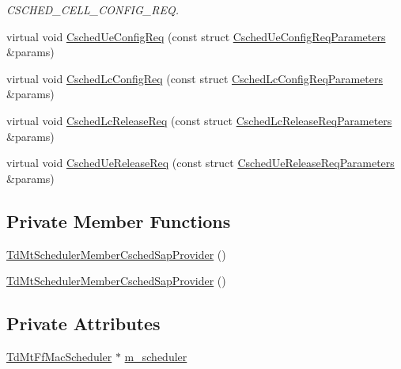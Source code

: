 \begin{DoxyCompactItemize}
\begin{DoxyCompactList}\small\item\em C\+S\+C\+H\+E\+D\+\_\+\+C\+E\+L\+L\+\_\+\+C\+O\+N\+F\+I\+G\+\_\+\+R\+EQ. \end{DoxyCompactList}\item 
virtual void \hyperlink{classns3_1_1TdMtSchedulerMemberCschedSapProvider_a41c5681871a2a5e0c9b5624b250d0a00}{Csched\+Ue\+Config\+Req} (const struct \hyperlink{structns3_1_1FfMacCschedSapProvider_1_1CschedUeConfigReqParameters}{Csched\+Ue\+Config\+Req\+Parameters} \&params)
\item 
virtual void \hyperlink{classns3_1_1TdMtSchedulerMemberCschedSapProvider_aef833b849d0f53fb16a9418734cc475c}{Csched\+Lc\+Config\+Req} (const struct \hyperlink{structns3_1_1FfMacCschedSapProvider_1_1CschedLcConfigReqParameters}{Csched\+Lc\+Config\+Req\+Parameters} \&params)
\item 
virtual void \hyperlink{classns3_1_1TdMtSchedulerMemberCschedSapProvider_aa1c0ff792851c9d7fdee4dc8f8e6caa5}{Csched\+Lc\+Release\+Req} (const struct \hyperlink{structns3_1_1FfMacCschedSapProvider_1_1CschedLcReleaseReqParameters}{Csched\+Lc\+Release\+Req\+Parameters} \&params)
\item 
virtual void \hyperlink{classns3_1_1TdMtSchedulerMemberCschedSapProvider_aec882a4915162718d2aa0ed132a26c27}{Csched\+Ue\+Release\+Req} (const struct \hyperlink{structns3_1_1FfMacCschedSapProvider_1_1CschedUeReleaseReqParameters}{Csched\+Ue\+Release\+Req\+Parameters} \&params)
\end{DoxyCompactItemize}
\subsection*{Private Member Functions}
\begin{DoxyCompactItemize}
\item 
\hyperlink{classns3_1_1TdMtSchedulerMemberCschedSapProvider_ae5c4d5951cd413ad543e828dc4648ed8}{Td\+Mt\+Scheduler\+Member\+Csched\+Sap\+Provider} ()
\item 
\hyperlink{classns3_1_1TdMtSchedulerMemberCschedSapProvider_ae5c4d5951cd413ad543e828dc4648ed8}{Td\+Mt\+Scheduler\+Member\+Csched\+Sap\+Provider} ()
\end{DoxyCompactItemize}
\subsection*{Private Attributes}
\begin{DoxyCompactItemize}
\item 
\hyperlink{classns3_1_1TdMtFfMacScheduler}{Td\+Mt\+Ff\+Mac\+Scheduler} $\ast$ \hyperlink{classns3_1_1TdMtSchedulerMemberCschedSapProvider_a55656bce806aa1c606dfa19276505ae1}{m\+\_\+scheduler}
\end{DoxyCompactItemize}



